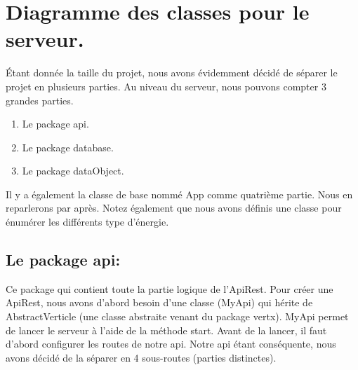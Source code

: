 \section{Diagramme des classes pour le serveur.}

\begin{flushleft}
Étant donnée la taille du projet, nous avons évidemment décidé de séparer le projet en plusieurs parties. Au niveau du serveur, nous pouvons compter 3 grandes parties.
\end{flushleft}

\begin{enumerate}[-]
\item Le package api.
\item Le package database.
\item Le package dataObject.
\end{enumerate}

\begin{flushleft}
Il y a également la classe de base nommé App comme quatrième partie. Nous en reparlerons par après.
Notez également que nous avons définis une classe pour énumérer les différents type d'énergie.
\end{flushleft}

\subsection{Le package api:}

\begin{flushleft}
Ce package qui contient toute la partie logique de l'ApiRest. Pour créer une ApiRest, nous avons d'abord besoin d'une classe (MyApi) qui hérite de AbstractVerticle (une classe abstraite venant du package vertx). MyApi permet de lancer le serveur à l'aide de la méthode start. Avant de la lancer, il faut d'abord configurer les routes de notre api. Notre api étant conséquente, nous avons décidé de la séparer en 4 sous-routes (parties distinctes).
\end{flushleft}


